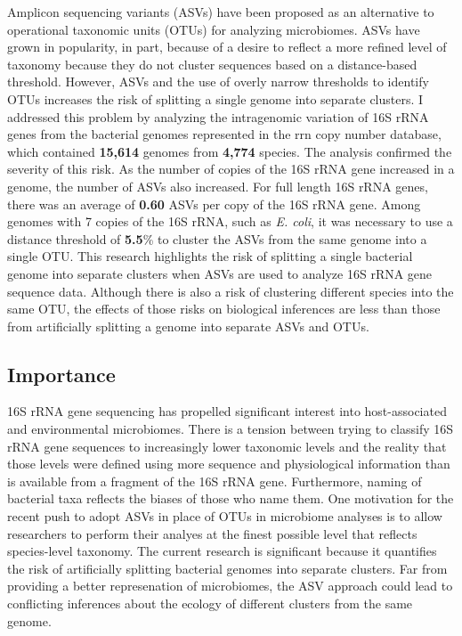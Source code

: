 \documentclass[
]{article}
\begin{document}
Amplicon sequencing variants (ASVs) have been proposed as an alternative
to operational taxonomic units (OTUs) for analyzing microbiomes. ASVs
have grown in popularity, in part, because of a desire to reflect a more
refined level of taxonomy because they do not cluster sequences based on
a distance-based threshold. However, ASVs and the use of overly narrow
thresholds to identify OTUs increases the risk of splitting a single
genome into separate clusters. I addressed this problem by analyzing the
intragenomic variation of 16S rRNA genes from the bacterial genomes
represented in the rrn copy number database, which contained
\textbf{15,614} genomes from \textbf{4,774} species. The analysis
confirmed the severity of this risk. As the number of copies of the 16S
rRNA gene increased in a genome, the number of ASVs also increased. For
full length 16S rRNA genes, there was an average of \textbf{0.60} ASVs
per copy of the 16S rRNA gene. Among genomes with 7 copies of the 16S
rRNA, such as \emph{E. coli}, it was necessary to use a distance
threshold of \textbf{5.5}\% to cluster the ASVs from the same genome
into a single OTU. This research highlights the risk of splitting a
single bacterial genome into separate clusters when ASVs are used to
analyze 16S rRNA gene sequence data. Although there is also a risk of
clustering different species into the same OTU, the effects of those
risks on biological inferences are less than those from artificially
splitting a genome into separate ASVs and OTUs.

\hypertarget{importance}{%
\subsection{Importance}\label{importance}}

16S rRNA gene sequencing has propelled significant interest into
host-associated and environmental microbiomes. There is a tension
between trying to classify 16S rRNA gene sequences to increasingly lower
taxonomic levels and the reality that those levels were defined using
more sequence and physiological information than is available from a
fragment of the 16S rRNA gene. Furthermore, naming of bacterial taxa
reflects the biases of those who name them. One motivation for the
recent push to adopt ASVs in place of OTUs in microbiome analyses is to
allow researchers to perform their analyes at the finest possible level
that reflects species-level taxonomy. The current research is
significant because it quantifies the risk of artificially splitting
bacterial genomes into separate clusters. Far from providing a better
represenation of microbiomes, the ASV approach could lead to conflicting
inferences about the ecology of different clusters from the same genome.
\end{document}
